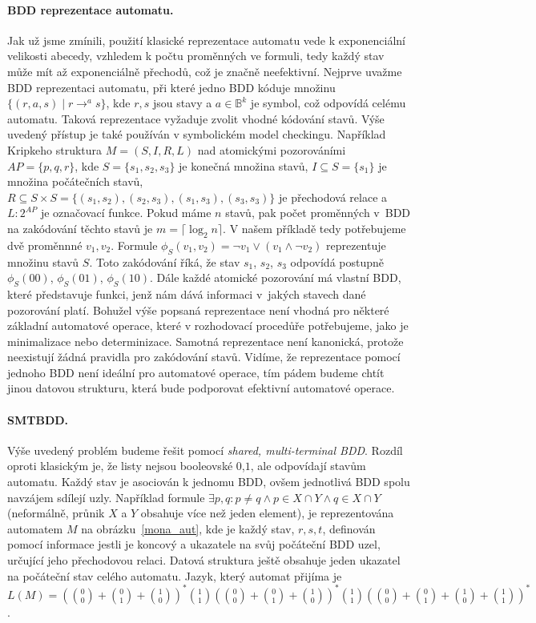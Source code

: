 \paragraph{BDD reprezentace automatu.} Jak už jsme zmínili, použití klasické reprezentace automatu vede k exponenciální velikosti abecedy, vzhledem k počtu proměnných ve formuli, tedy každý stav může mít až exponenciálně přechodů, což je značně neefektivní. Nejprve uvažme BDD reprezentaci automatu, při které jedno BDD kóduje množinu $ \{ (r,a,s) \mid r \rightarrow^a s \} $, kde $r,s$ jsou stavy a $a \in \mathbb{B}^k$ je symbol, což odpovídá celému automatu. Taková reprezentace vyžaduje zvolit vhodné kódování stavů. Výše uvedený přístup je také používán v symbolickém model checkingu. Například Kripkeho struktura $M=(S,I,R,L)$ nad atomickými pozorováními $AP = \{ p,q,r \} $, kde $S= \{ s_1,s_2,s_3 \}$ je konečná množina stavů, $ I \subseteq S = \{ s_1 \} $ je množina počátečních stavů, $R \subseteq S \times S = \{ (s_1,s_2),(s_2,s_3),(s_1,s_3),(s_3,s_3) \} $ je přechodová relace a $ L : 2^{AP} $ je označovací funkce. Pokud máme $n$ stavů, pak počet proměnných v~BDD na zakódování těchto stavů je $m = \lceil \log_2n \rceil $. V našem příkladě tedy potřebujeme dvě proměnnné $v_1,v_2$. Formule $\phi_S(v_1,v_2) =\neg v_1 \vee (v_1 \wedge \neg v_2) $ reprezentuje množinu stavů $S$. Toto zakódování říká, že stav $s_1$, $s_2$, $s_3$ odpovídá postupně $\phi_S(00)$, $\phi_S(01)$, $\phi_S(10)$. Dále každé atomické pozorování má vlastní BDD, které představuje funkci, jenž nám dává informaci v~jakých stavech dané pozorování platí. Bohužel výše popsaná reprezentace není vhodná pro některé základní automatové operace, které v rozhodovací procedůře potřebujeme, jako je minimalizace nebo determinizace. Samotná reprezentace není kanonická, protože neexistují žádná pravidla pro zakódování stavů. Vidíme, že reprezentace pomocí jednoho BDD není ideální pro automatové operace, tím pádem budeme chtít jinou datovou strukturu, která bude podporovat efektivní automatové operace.

\paragraph{SMTBDD.} Výše uvedený problém budeme řešit pomocí \textit{shared, multi-terminal BDD}. Rozdíl oproti klasickým je, že listy nejsou booleovské $0$,$1$, ale odpovídají stavům automatu. Každý stav je asociován k jednomu BDD, ovšem jednotlivá BDD spolu navzájem sdílejí uzly. Například formule $\exists p,q: p \neq q \wedge p \in X \cap Y \wedge q \in X \cap Y $ (neformálně, průnik $X$ a $Y$ obsahuje více než jeden element), je reprezentována automatem $M$ na obrázku~\ref{mona_aut}, kde je každý stav, $r,s,t$, definován pomocí informace jestli je koncový a ukazatele na svůj počáteční BDD uzel, určující jeho přechodovou relaci. Datová struktura ještě obsahuje jeden ukazatel na počáteční stav celého automatu. Jazyk, který automat přijíma je $L(M)= (\binom{0}{0}+\binom{0}{1}+\binom{1}{0})^*\binom{1}{1}(\binom{0}{0}+\binom{0}{1}+\binom{1}{0})^*\binom{1}{1} (\binom{0}{0}+\binom{0}{1}+\binom{1}{0}+\binom{1}{1})^* $.

